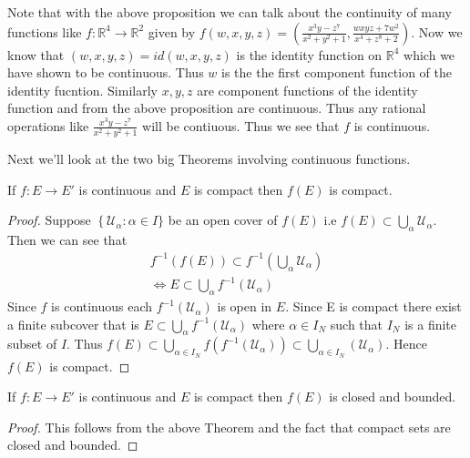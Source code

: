 Note that with the above proposition we can talk about the continuity of many functions like
$f : \mathbb{R}^4 \to \mathbb{R}^2$ given by $f(w,x,y,z) = \left( \frac{x^3y - z^7}{x^2+y^2+1},
\frac{wxyz + 7w^2}{x^4+z^8+2}\right)$. Now we know that $(w,x,y,z) = id(w,x,y,z)$ is the
identity function on $\mathbb{R}^4$ which we have shown to be continuous. Thus $w$ is the the first
component function of the identity fucntion. Similarly $x,y,z$ are component functions of the
identity function and from the above proposition are continuous. Thus any rational operations like 
$\frac{x^3y - z^7}{x^2+y^2+1}$ will be contiuous. Thus we see that $f$ is continuous.

Next we'll look at the two big Theorems involving continuous functions.

\begin{Theorem}[name=Continuous function in compact sets]
    If $f : E \to E'$ is continuous and $E$ is compact then $f(E)$ is compact. 
\end{Theorem}
\begin{proof}
    Suppose $\left\lbrace \mathcal{U}_{\alpha} : \alpha \in I\rbrace\right.$ be an open cover of 
    $f(E)$ i.e $f(E) \subset \bigcup_{\alpha} \mathcal{U}_{\alpha} $. Then we can see that 
    \begin{displaymath}
	\begin{aligned}
	    f^{-1}(f(E)) \subset f^{-1}\left(\bigcup_{\alpha} \mathcal{U}_{\alpha}\right) \\
	    \Leftrightarrow E \subset \bigcup_{\alpha} f^{-1}\left(\mathcal{U}_{\alpha}\right)
	\end{aligned}
    \end{displaymath}	    
    Since $f$ is continuous each $f^{-1}\left(\mathcal{U}_{\alpha}\right)$ is open in $E$. Since
    E is compact there exist a finite subcover that is $E \subset \bigcup_{\alpha} 
    f^{-1}\left(\mathcal{U}_{\alpha}\right)$ where $\alpha \in I_N$ such that $I_N$ is a finite
    subset of $I$. Thus $f(E) \subset \bigcup_{\alpha \in I_N}
    f(f^{-1}\left(\mathcal{U}_{\alpha }\right)) \subset 
    \bigcup_{\alpha \in I_N}\left(\mathcal{U}_{\alpha}
    \right)$. Hence $f(E)$ is compact.
\end{proof}
\begin{Corollary}
    If $f : E \to E'$ is continuous and $E$ is compact then $f(E)$ is closed and bounded.
\end{Corollary}
\begin{proof}
    This follows from the above Theorem and the fact that compact sets are closed and bounded.
\end{proof}
